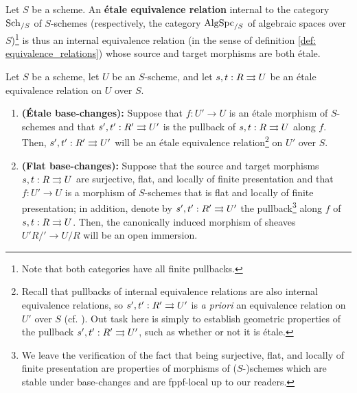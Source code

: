             \begin{definition} \label{def: etale_equivalence_relations}
                Let $S$ be a scheme. An \textbf{\'etale equivalence relation} internal to the category $\mathrm{Sch}_{/S}$ of $S$-schemes (respectively, the category $\mathrm{Alg}\mathrm{Spc}_{/S}$ of algebraic spaces over $S$)\footnote{Note that both categories have all finite pullbacks.} is thus an internal equivalence relation (in the sense of definition \ref{def: equivalence_relations}) whose source and target morphisms are both \'etale.
            \end{definition}
            \begin{lemma} \label{lemma: base_changing_etale_and_flat_equivalence_relations_in_schemes}
                Let $S$ be a scheme, let $U$ be an $S$-scheme, and let $s, t: R \rightrightarrows U$ be an \'etale equivalence relation on $U$ over $S$.
                    \begin{enumerate}
                        \item \textbf{(\'Etale base-changes):} Suppose that $f: U' \to U$ is an \'etale morphism of $S$-schemes and that $s', t': R' \rightrightarrows U'$ is the pullback of $s, t: R \rightrightarrows U$ along $f$. Then, $s', t': R' \rightrightarrows U'$ will be an \'etale equivalence relation\footnote{Recall that pullbacks of internal equivalence relations are also internal equivalence relations, so $s', t': R' \rightrightarrows U'$ is \textit{a priori} an equivalence relation on $U'$ over $S$ (cf. \cite[\href{https://stacks.math.columbia.edu/tag/02V8}{Tag 02V8}]{stacks}). Out task here is simply to establish geometric properties of the pullback $s', t': R' \rightrightarrows U'$, such as whether or not it is \'etale.} on $U'$ over $S$.
                        \item \textbf{(Flat base-changes):} Suppose that the source and target morphisms $s, t: R \rightrightarrows U$ are surjective, flat, and locally of finite presentation and that $f: U' \to U$ is a morphism of $S$-schemes that is flat and locally of finite presentation; in addition, denote by $s', t': R' \rightrightarrows U'$ the pullback\footnote{We leave the verification of the fact that being surjective, flat, and locally of finite presentation are properties of morphisms of ($S$-)schemes which are stable under base-changes and are fppf-local up to our readers. } along $f$ of $s, t: R \rightrightarrows U$. Then, the canonically induced morphism of sheaves $U'R/' \to U/R$ will be an open immersion. 
                    \end{enumerate}
            \end{lemma}
